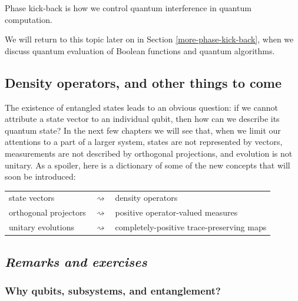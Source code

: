 \documentclass[fleqn,a4paper]{article}
\newenvironment{idea}{\everypar{\setlength{\parindent}{1.5em}}}{}
\theoremstyle{definition}
\theoremstyle{definition}
\theoremstyle{definition}
\theoremstyle{definition}
\theoremstyle{remark}
\begin{document}
\begin{idea}
Phase kick-back is how we control quantum interference in quantum computation.

\end{idea}

We will return to this topic later on in Section \ref{more-phase-kick-back}, when we discuss quantum evaluation of Boolean functions and quantum algorithms.

\hypertarget{density-operators-and-other-things-to-come}{%
\subsection{Density operators, and other things to come}\label{density-operators-and-other-things-to-come}}

The existence of entangled states leads to an obvious question: if we cannot attribute a state vector to an individual qubit, then how can we describe its quantum state?
In the next few chapters we will see that, when we limit our attentions to a part of a larger system, states are not represented by vectors, measurements are not described by orthogonal projections, and evolution is not unitary.
As a spoiler, here is a dictionary of some of the new concepts that will soon be introduced:

\begin{longtable}[]{@{}
  >{\raggedleft\arraybackslash}p{}
  >{\centering\arraybackslash}p{}
  >{\raggedright\arraybackslash}p{}@{}}
\toprule()
\endhead
state vectors & \(\rightsquigarrow\) & density operators \\
orthogonal projectors & \(\rightsquigarrow\) & positive operator-valued measures \\
unitary evolutions & \(\rightsquigarrow\) & completely-positive trace-preserving maps \\
\bottomrule()
\end{longtable}

\hypertarget{remarks-and-exercises-entanglement}{%
\subsection{\texorpdfstring{\emph{Remarks and exercises}}{Remarks and exercises}}\label{remarks-and-exercises-entanglement}}

\hypertarget{why-qubits-subsystems-and-entanglement}{%
\subsubsection{Why qubits, subsystems, and entanglement?}\label{why-qubits-subsystems-and-entanglement}}
\end{document}
